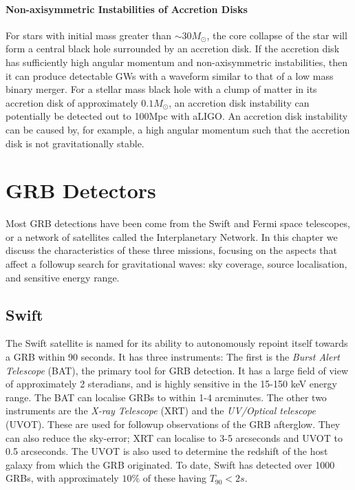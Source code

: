 \documentclass[11pt]{cuthesis}
\begin{document}
\paragraph{Non-axisymmetric Instabilities of Accretion Disks}
For stars with initial mass greater than $\sim 30M_\odot$, the core collapse of the star will form a central black hole surrounded by an accretion disk. If the accretion disk has sufficiently high angular momentum and non-axisymmetric instabilities, then it can produce detectable GWs with a waveform similar to that of a low mass binary merger. For a stellar mass black hole with a clump of matter in its accretion disk of approximately $0.1M_\odot$, an accretion disk instability can potentially be detected out to 100Mpc with aLIGO\cite{gw_grb_paradigm}. An accretion disk instability can be caused by, for example, a high angular momentum such that the accretion disk is not gravitationally stable. 

\section{GRB Detectors} \label{sec:grb detectors}
Most GRB detections have been come from the Swift and Fermi space telescopes, or a network of satellites called the Interplanetary Network. In this chapter we discuss the characteristics of these three missions, focusing on the aspects that affect a followup search for gravitational waves: sky coverage, source localisation, and sensitive energy range. 

\subsection{Swift}
The Swift satellite is named for its ability to autonomously repoint itself towards a GRB within 90 seconds. It has three instruments: The first is the \textit{Burst Alert Telescope} (BAT), the primary tool for GRB detection. It has a large field of view of approximately 2 steradians, and is highly sensitive in the 15-150 keV energy range. The BAT can localise GRBs to within 1-4 arcminutes. The other two instruments are the \textit{X-ray Telescope} (XRT) and the \textit{UV/Optical telescope} (UVOT). These are used for followup observations of the GRB afterglow. They can also reduce the sky-error; XRT can localise to 3-5 arcseconds and UVOT to 0.5 arcseconds\cite{swift}. The UVOT is also used to determine the redshift of the host galaxy from which the GRB originated. To date, Swift has detected over 1000 GRBs, with approximately $10\%$ of these having $T_{90}<2s$.\cite{swift2}
\end{document}
